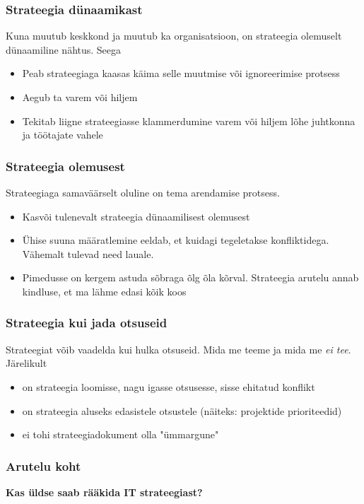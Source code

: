 \begin{frame}[fragile]
  \frametitle{Strateegia dünaamikast}
  Kuna muutub keskkond ja muutub ka organisatsioon, on strateegia olemuselt dünaamiline nähtus. Seega
	\begin{itemize}
		\item Peab strateegiaga kaasas käima selle muutmise või ignoreerimise protsess
		\item Aegub ta varem või hiljem
		\item Tekitab liigne strateegiasse klammerdumine varem või hiljem lõhe juhtkonna ja töötajate vahele
	\end{itemize}
\end{frame}

\begin{frame}[fragile]
  \frametitle{Strateegia olemusest}
  Strateegiaga samaväärselt oluline on tema arendamise protsess. 
	\begin{itemize}
		\item Kasvõi tulenevalt strateegia dünaamilisest olemusest
		\item Ühise suuna määratlemine eeldab, et kuidagi tegeletakse konfliktidega. Vähemalt tulevad need lauale.
		\item Pimedusse on kergem astuda sõbraga õlg õla kõrval. Strateegia arutelu annab kindluse, et ma lähme edasi kõik koos
	\end{itemize}
\end{frame}

\begin{frame}[fragile]
  \frametitle{Strateegia kui jada otsuseid}
	Strateegiat võib vaadelda kui hulka otsuseid. Mida me teeme ja mida me \emph{ei tee}. Järelikult
	\begin{itemize}
		\item on strateegia loomisse, nagu igasse otsusesse, sisse ehitatud konflikt
		\item on strateegia aluseks edasistele otsustele (näiteks: projektide prioriteedid)
		\item ei tohi strateegiadokument olla "ümmargune"
	\end{itemize}
\end{frame}


\begin{frame}[fragile]
  \frametitle{Arutelu koht}
		\begin{center}
			\textbf{Kas üldse saab rääkida IT strateegiast?}
		\end{center}
\end{frame}

